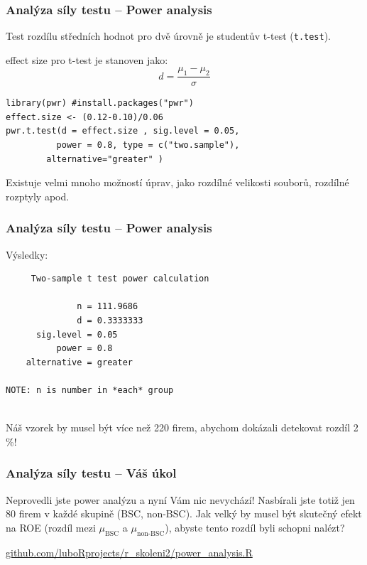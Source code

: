 \documentclass[10pt,xcolor={dvipsnames}]{beamer}
\begin{document}

\begin{frame}[fragile]
\frametitle{Analýza síly testu -- Power analysis}
Test rozdílu středních hodnot pro dvě úrovně je studentův t-test (\texttt{t.test}).\newline\smallskip

effect size pro t-test je stanoven jako: \[d=\frac{\mu_1 - \mu_2}{\sigma}\]

\begin{verbatim}
library(pwr) #install.packages("pwr")
effect.size <- (0.12-0.10)/0.06
pwr.t.test(d = effect.size , sig.level = 0.05, 
	      power = 0.8, type = c("two.sample"),
		alternative="greater" )
\end{verbatim}

Existuje velmi mnoho možností úprav, jako rozdílné velikosti souborů, rozdílné rozptyly apod.
\end{frame}


\begin{frame}[fragile]
\frametitle{Analýza síly testu -- Power analysis}
Výsledky:
\begin{verbatim}
     Two-sample t test power calculation 

              n = 111.9686
              d = 0.3333333
      sig.level = 0.05
          power = 0.8
    alternative = greater

NOTE: n is number in *each* group


\end{verbatim}

\textcolor{WildStrawberry}{Náš vzorek by musel být více než 220 firem, abychom dokázali detekovat rozdíl 2 \%!}

\end{frame}


\begin{frame}[fragile]
\frametitle{Analýza síly testu -- Váš úkol}
\begin{Large}

Neprovedli jste power analýzu a nyní Vám nic nevychází! Nasbírali jste totiž jen 80 firem v každé skupině (BSC, non-BSC). Jak velký by musel být skutečný efekt na ROE (rozdíl mezi $\mu_{\text{BSC}}$ a $\mu_{\text{non-BSC}}$), abyste tento rozdíl byli schopni nalézt?
\end{Large}\newline\smallskip

\url{github.com/luboRprojects/r_skoleni2/power_analysis.R}
\end{frame}
\end{document}
